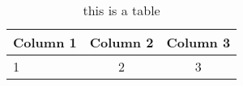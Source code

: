 \begin{table}[]
\centering\footnotesize
\caption{this is a table}
\label{tab:table1}
\begin{tabular}{@{}lcc@{}}
\toprule
\textbf{Column 1} & \textbf{Column 2} & \textbf{Column 3}\\ \midrule
1 & 2 & 3\\
\end{tabular}
\end{table}

\begin{minipage}[!h]{1.0\linewidth}
\inputminted[fontsize=\scriptsize,linenos=true,bgcolor=background]{S}{./code/test.R}
\label{code:code1}
\end{minipage}



%
